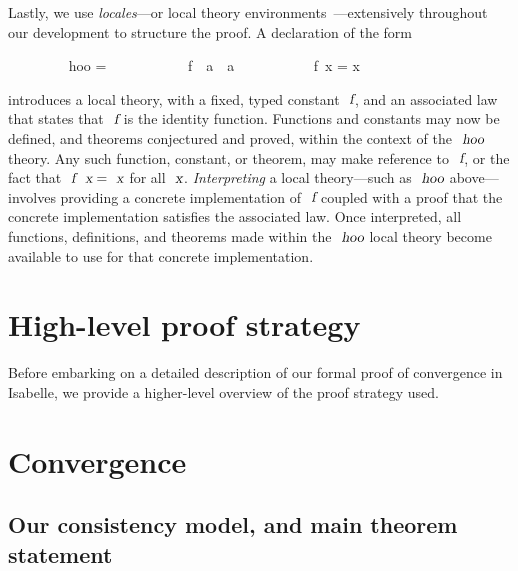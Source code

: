 \documentclass[acmlarge,review,anonymous]{acmart}\settopmatter{printfolios=true}
\begin{document}
Lastly, we use \emph{locales}---or local theory environments~\cite{DBLP:conf/types/HaftmannW08}---extensively throughout our development to structure the proof.
A declaration of the form
\\
\begin{isabellebody}
\ \ \ \ \ \ \ \  hoo = \isanewline
\ \ \ \ \ \ \ \ \ \ \ f\ {\isacharcolon}{\isacharcolon}\ {\isachardoublequoteopen}{\isacharprime}a\ {\isasymRightarrow}\ {\isacharprime}a{\isachardoublequoteclose}\isanewline
\ \ \ \ \ \ \ \ \ \  {\isachardoublequoteopen}f\ x = x{\isachardoublequoteclose}
\end{isabellebody}
\vspace{\baselineskip}
\noindent
introduces a local theory, with a fixed, typed constant $\isa{f}$, and an associated law that states that $\isa{f}$ is the identity function.
Functions and constants may now be defined, and theorems conjectured and proved, within the context of the $\isa{hoo}$ theory.
Any such function, constant, or theorem, may make reference to $\isa{f}$, or the fact that $\isa{f}\ \isa{x} = \isa{x}$ for all $\isa{x}$.
\emph{Interpreting} a local theory---such as $\isa{hoo}$ above---involves providing a concrete implementation of $\isa{f}$ coupled with a proof that the concrete implementation satisfies the associated law.
Once interpreted, all functions, definitions, and theorems made within the $\isa{hoo}$ local theory become available to use for that concrete implementation.

\section{High-level proof strategy}
\label{sect.high-level.proof.strategy}

Before embarking on a detailed description of our formal proof of convergence in Isabelle, we provide a higher-level overview of the proof strategy used.


\section{Convergence}
\label{sect.convergence}

\subsection{Our consistency model, and main theorem statement}
\label{subsect.consistency.model.main.theorem.statement}
\end{document}
